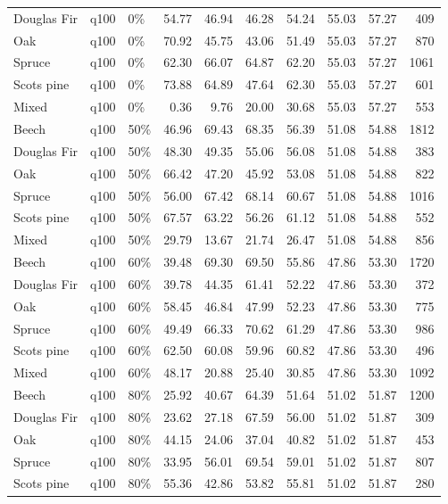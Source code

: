 \begin{longtable}{lllrrrrrrr}
  Douglas Fir & q100 & 0\% & 54.77 & 46.94 & 46.28 & 54.24 & 55.03 & 57.27 & 409 \\ 
  Oak & q100 & 0\% & 70.92 & 45.75 & 43.06 & 51.49 & 55.03 & 57.27 & 870 \\ 
  Spruce & q100 & 0\% & 62.30 & 66.07 & 64.87 & 62.20 & 55.03 & 57.27 & 1061 \\ 
  Scots pine & q100 & 0\% & 73.88 & 64.89 & 47.64 & 62.30 & 55.03 & 57.27 & 601 \\ 
  Mixed & q100 & 0\% & 0.36 & 9.76 & 20.00 & 30.68 & 55.03 & 57.27 & 553 \\ 
  Beech & q100 & 50\% & 46.96 & 69.43 & 68.35 & 56.39 & 51.08 & 54.88 & 1812 \\ 
  Douglas Fir & q100 & 50\% & 48.30 & 49.35 & 55.06 & 56.08 & 51.08 & 54.88 & 383 \\ 
  Oak & q100 & 50\% & 66.42 & 47.20 & 45.92 & 53.08 & 51.08 & 54.88 & 822 \\ 
  Spruce & q100 & 50\% & 56.00 & 67.42 & 68.14 & 60.67 & 51.08 & 54.88 & 1016 \\ 
  Scots pine & q100 & 50\% & 67.57 & 63.22 & 56.26 & 61.12 & 51.08 & 54.88 & 552 \\ 
  Mixed & q100 & 50\% & 29.79 & 13.67 & 21.74 & 26.47 & 51.08 & 54.88 & 856 \\ 
  Beech & q100 & 60\% & 39.48 & 69.30 & 69.50 & 55.86 & 47.86 & 53.30 & 1720 \\ 
  Douglas Fir & q100 & 60\% & 39.78 & 44.35 & 61.41 & 52.22 & 47.86 & 53.30 & 372 \\ 
  Oak & q100 & 60\% & 58.45 & 46.84 & 47.99 & 52.23 & 47.86 & 53.30 & 775 \\ 
  Spruce & q100 & 60\% & 49.49 & 66.33 & 70.62 & 61.29 & 47.86 & 53.30 & 986 \\ 
  Scots pine & q100 & 60\% & 62.50 & 60.08 & 59.96 & 60.82 & 47.86 & 53.30 & 496 \\ 
  Mixed & q100 & 60\% & 48.17 & 20.88 & 25.40 & 30.85 & 47.86 & 53.30 & 1092 \\ 
  Beech & q100 & 80\% & 25.92 & 40.67 & 64.39 & 51.64 & 51.02 & 51.87 & 1200 \\ 
  Douglas Fir & q100 & 80\% & 23.62 & 27.18 & 67.59 & 56.00 & 51.02 & 51.87 & 309 \\ 
  Oak & q100 & 80\% & 44.15 & 24.06 & 37.04 & 40.82 & 51.02 & 51.87 & 453 \\ 
  Spruce & q100 & 80\% & 33.95 & 56.01 & 69.54 & 59.01 & 51.02 & 51.87 & 807 \\ 
  Scots pine & q100 & 80\% & 55.36 & 42.86 & 53.82 & 55.81 & 51.02 & 51.87 & 280 \\ 

\end{longtable}
